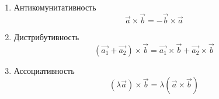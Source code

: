 \begin{enumerate}
  \item Антикомунитативность \[
    \vec{a} \times \vec{b} = - \vec{b} \times \vec{a}
  \] 
\item Дистрибутивность \[
    \left( \vec{a_1} + \vec{a_2} \right) \times \vec{b} = \vec{a_1} \times \vec{b} + \vec{a_2} \times  \vec{b} 
  \]  
  \item Ассоциативность \[
    \left( \lambda \vec{a} \right) \times \vec{b} = \lambda \left( \vec{a} \times \vec{b} \right)  
  \]
\end{enumerate}

